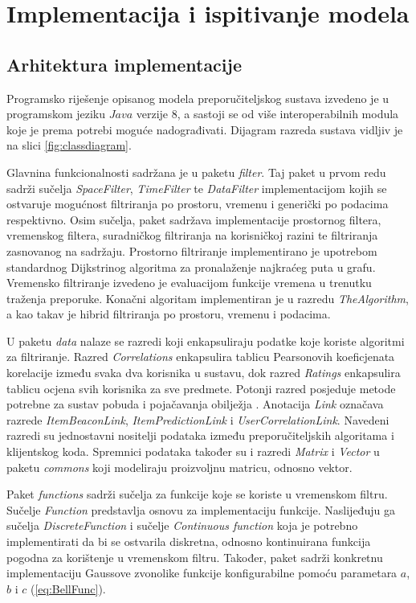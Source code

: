 \documentclass[times, utf8, diplomski, numeric]{fer}
\begin{document}
\chapter{Implementacija i ispitivanje modela}
\section{Arhitektura implementacije}

Programsko riješenje opisanog modela preporučiteljskog sustava izvedeno je u
programskom jeziku $Java$ verzije $8$, a sastoji se od više interoperabilnih
modula koje je prema potrebi moguće nadograđivati. Dijagram razreda sustava
vidljiv je na slici \ref{fig:classdiagram}.

Glavnina funkcionalnosti sadržana je u paketu \emph{filter}. Taj paket u prvom
redu sadrži sučelja \emph{SpaceFilter}, \emph{TimeFilter} te \emph{DataFilter}
implementacijom kojih se ostvaruje mogućnost filtriranja po prostoru, vremenu i
generički po podacima respektivno.
Osim sučelja, paket sadržava implementacije prostornog filtera, vremenskog
filtera, suradničkog filtriranja na korisničkoj razini te filtriranja zasnovanog
na sadržaju. Prostorno filtriranje implementirano je upotrebom standardnog
Dijkstrinog algoritma za pronalaženje najkraćeg puta u grafu. Vremensko
filtriranje izvedeno je evaluacijom funkcije vremena u trenutku traženja
preporuke. Konačni algoritam implementiran je u razredu \emph{TheAlgorithm}, a
kao takav je hibrid filtriranja po prostoru, vremenu i podacima.

U paketu \emph{data} nalaze se razredi koji enkapsuliraju podatke koje koriste
algoritmi za filtriranje. Razred \emph{Correlations} enkapsulira tablicu
Pearsonovih koeficjenata korelacije između svaka dva korisnika u sustavu, dok
razred \emph{Ratings} enkapsulira tablicu ocjena svih korisnika za sve predmete.
Potonji razred posjeduje metode potrebne za sustav pobuda i pojačavanja
obilježja . Anotacija  \emph{Link} označava
razrede \emph{ItemBeaconLink}, \emph{ItemPredictionLink} i
\emph{UserCorrelationLink}. Navedeni razredi su jednostavni nositelji podataka
između preporučiteljskih algoritama i klijentskog koda. Spremnici podataka
također su i razredi \emph{Matrix} i \emph{Vector} u paketu \emph{commons} koji
modeliraju proizvoljnu matricu, odnosno vektor.

Paket \emph{functions} sadrži sučelja za funkcije koje se koriste u vremenskom
filtru. Sučelje \emph{Function} predstavlja osnovu za implementaciju funkcije.
Naslijeđuju ga sučelja \emph{DiscreteFunction} i sučelje \emph{Continuous
function} koja je potrebno implementirati da bi se ostvarila diskretna, odnosno
kontinuirana funkcija pogodna za korištenje u vremenskom filtru. Također, paket
sadrži konkretnu implementaciju Gaussove zvonolike funkcije konfigurabilne
pomoću parametara $a$, $b$ i $c$ (\ref{eq:BellFunc}).
\end{document}
